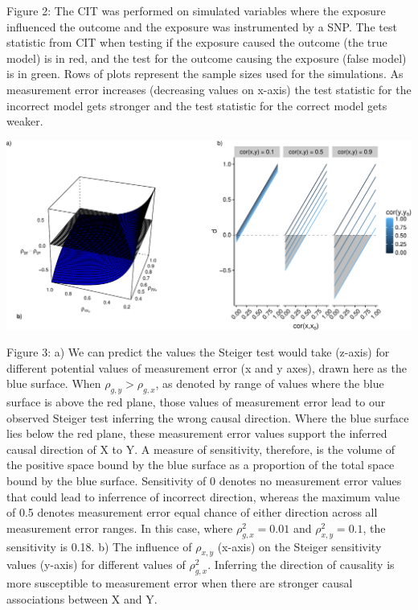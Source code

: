 \documentclass[]{article}
\begin{document}
Figure 2: The CIT was performed on simulated variables where the
exposure influenced the outcome and the exposure was instrumented by a
SNP. The test statistic from CIT when testing if the exposure caused the
outcome (the true model) is in red, and the test for the outcome causing
the exposure (false model) is in green. Rows of plots represent the
sample sizes used for the simulations. As measurement error increases
(decreasing values on x-axis) the test statistic for the incorrect model
gets stronger and the test statistic for the correct model gets weaker.

\newpage

\includegraphics{manuscript_files/figure-latex/steiger_sensitivity_plot-1.pdf}

Figure 3: a) We can predict the values the Steiger test would take
(z-axis) for different potential values of measurement error (x and y
axes), drawn here as the blue surface. When \(\rho_{g,y} > \rho_{g,x}\),
as denoted by range of values where the blue surface is above the red
plane, those values of measurement error lead to our observed Steiger
test inferring the wrong causal direction. Where the blue surface lies
below the red plane, these measurement error values support the inferred
causal direction of X to Y. A measure of sensitivity, therefore, is the
volume of the positive space bound by the blue surface as a proportion
of the total space bound by the blue surface. Sensitivity of 0 denotes
no measurement error values that could lead to inferrence of incorrect
direction, whereas the maximum value of 0.5 denotes measurement error
equal chance of either direction across all measurement error ranges. In
this case, where \(\rho_{g,x}^2 = 0.01\) and \(\rho_{x,y}^2 = 0.1\), the
sensitivity is 0.18. b) The influence of \(\rho_{x,y}\) (x-axis) on the
Steiger sensitivity values (y-axis) for different values of
\(\rho_{g,x}^2\). Inferring the direction of causality is more
susceptible to measurement error when there are stronger causal
associations between X and Y.
\end{document}
